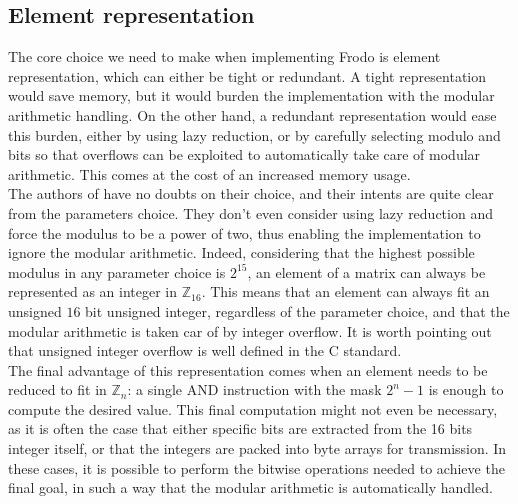 \subsection{Element representation}
The core choice we need to make when implementing Frodo is element representation, which can either be tight or redundant. A tight representation would save memory, but it would burden the implementation with the modular arithmetic handling. On the other hand, a redundant representation would ease this burden, either by using lazy reduction, or by carefully selecting modulo and bits so that overflows can be exploited to automatically take care of modular arithmetic. This comes at the cost of an increased memory usage.\\
The authors of \cite{frodo} have no doubts on their choice, and their intents are quite clear from the parameters choice. They don't even consider using lazy reduction and force the modulus to be a power of two, thus enabling the implementation to ignore the modular arithmetic. Indeed, considering that the highest possible modulus in any parameter choice is $2^{15}$, an element of a matrix can always be represented as an integer in $\mathbb{Z}_{16}$. This means that an element can always fit an unsigned $16$ bit unsigned integer, regardless of the parameter choice, and that the modular arithmetic is taken car of by integer overflow. It is worth pointing out that unsigned integer overflow is well defined in the C standard.\\
The final advantage of this representation comes when an element needs to be reduced to fit in $\mathbb{Z}_n$: a single AND instruction with the mask $2^{n}-1$ is enough to compute the desired value. This final computation might not even be necessary, as it is often the case that either specific bits are extracted from the 16 bits integer itself, or that the integers are packed into byte arrays for transmission. In these cases, it is possible to perform the bitwise operations needed to achieve the final goal, in such a way that the modular arithmetic is automatically handled.\\

